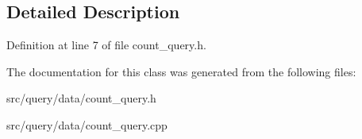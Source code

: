 \subsection{Detailed Description}


Definition at line 7 of file count\+\_\+query.\+h.



The documentation for this class was generated from the following files\+:\begin{DoxyCompactItemize}
\item 
src/query/data/count\+\_\+query.\+h\item 
src/query/data/count\+\_\+query.\+cpp\end{DoxyCompactItemize}
